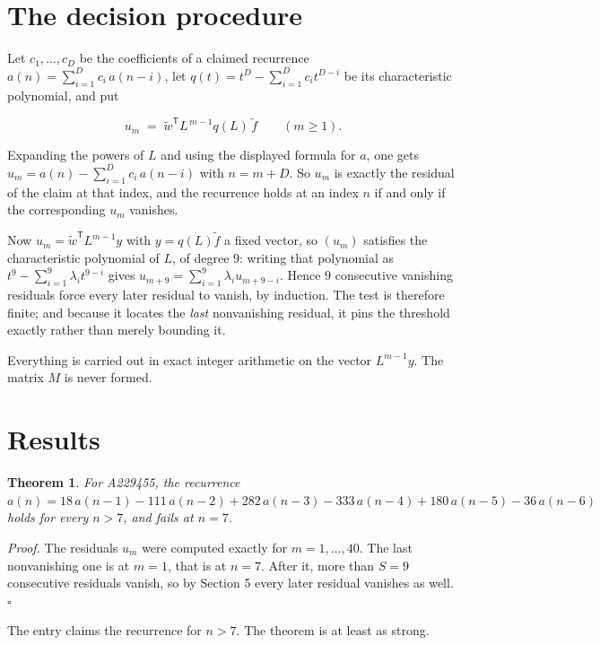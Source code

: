 \documentclass[11pt]{article}
\newtheorem{theorem}{Theorem}
\theoremstyle{definition}
\begin{document}
\section{The decision procedure}

Let $c_1,\dots,c_D$ be the coefficients of a claimed recurrence $a(n) = \sum_{i=1}^{D} c_i\,a(n-i)$, let $q(t) = t^{D} - \sum_{i=1}^{D} c_i t^{D-i}$ be its characteristic polynomial, and put

\[u_m \;=\; \tilde w^{\mathsf T} L^{\,m-1} q(L)\,\tilde f \qquad (m \ge 1).\]

Expanding the powers of $L$ and using the displayed formula for $a$, one gets $u_m = a(n) - \sum_{i=1}^{D} c_i\,a(n-i)$ with $n = m + D$. So $u_m$ is exactly the residual of the claim at that index, and the recurrence holds at an index $n$ if and only if the corresponding $u_m$ vanishes.

Now $u_m = \tilde w^{\mathsf T} L^{m-1} y$ with $y = q(L)\tilde f$ a fixed vector, so $(u_m)$ satisfies the characteristic polynomial of $L$, of degree $9$: writing that polynomial as $t^{9} - \sum_{i=1}^{9} \lambda_i t^{9-i}$ gives $u_{m+9} = \sum_{i=1}^{9} \lambda_i u_{m+9-i}$. Hence $9$ consecutive vanishing residuals force every later residual to vanish, by induction. The test is therefore finite; and because it locates the {\itshape last} nonvanishing residual, it pins the threshold exactly rather than merely bounding it.

Everything is carried out in exact integer arithmetic on the vector $L^{m-1}y$. The matrix $M$ is never formed.

\section{Results}

\begin{theorem} For A229455, the recurrence $a(n) = 18\,a(n-1) - 111\,a(n-2) + 282\,a(n-3) - 333\,a(n-4) + 180\,a(n-5) - 36\,a(n-6)$ holds for every $n > 7$, and fails at $n = 7$.\end{theorem}

{\itshape Proof.} The residuals $u_m$ were computed exactly for $m = 1,\dots,40$. The last nonvanishing one is at $m = 1$, that is at $n = 7$. After it, more than $S = 9$ consecutive residuals vanish, so by Section 5 every later residual vanishes as well. $\square$

The entry claims the recurrence for $n > 7$. The theorem is at least as strong.
\end{document}
